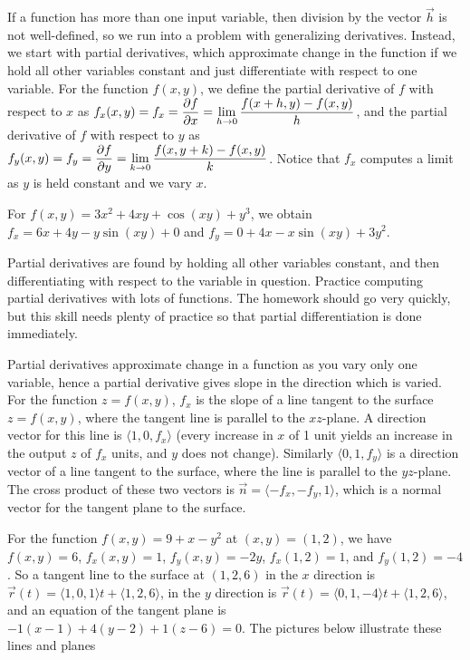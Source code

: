 If a function has more than one input variable, then division by the
vector $\vec h$ is not well-defined, so we run into a problem with
generalizing derivatives.  Instead, we start with partial derivatives,
which approximate change in the function if we hold all other
variables constant and just differentiate with respect to one
variable.  For the function $f(x,y)$, we define the partial derivative
of $f$ with respect to $x$ as $\displaystyle f_x(x,y)=f_x = \frac{\partial f}{\partial x}=
\lim_{h\to 0}\frac{f(x+h,y)-f(x,y)}{h}$, and the partial derivative of
$f$ with respect to $y$ as $\displaystyle f_y(x,y)=f_y =\frac{\partial f}{\partial y}=
\lim_{k\to 0}\frac{f(x,y+k)-f(x,y)}{k}$. Notice that $f_x$ computes a
limit as $y$ is held constant and we vary $x$. 
\begin{example}
For
$f(x,y)=3x^2+4xy+\cos(xy)+y^3$, we obtain $f_x=6x+4y-y\sin(xy)+0$ and
$f_y=0+4x-x\sin(xy)+3y^2$.
\end{example}
 Partial derivatives are found by holding
all other variables constant, and then differentiating with respect to
the variable in question. Practice computing partial derivatives with
lots of functions. The homework should go very quickly, but this skill
needs plenty of practice so that partial differentiation is done
immediately.

Partial derivatives approximate change in a function as you vary only
one variable, hence a partial derivative gives slope in the direction
which is varied. For the function $z=f(x,y)$, $f_x$ is the slope of a
line tangent to the surface $z=f(x,y)$, where the tangent line is
parallel to the $xz$-plane. A direction vector for this line is
$\langle1,0,f_x\rangle$ (every increase in $x$ of 1 unit yields an
increase in the output $z$ of $f_x$ units, and $y$ does not change). 
Similarly $\langle0,1,f_y\rangle$ is a direction vector of a line
tangent to the surface, where the line is parallel to the $yz$-plane.
The cross product of these two vectors is $\vec n =
\langle-f_x,-f_y,1\rangle$, which is a normal vector for the tangent
plane to the surface. 

\begin{example}
For the function $f(x,y)=9+x-y^2$ at
$(x,y)=(1,2)$, we have $f(x,y)=6$, $f_x(x,y) =1$, $f_y(x,y)=-2y$,
$f_x(1,2)=1$, and $f_y(1,2)=-4$. So a tangent line to the surface at
$(1,2,6)$ in the $x$ direction is $\vec r(t) = \langle1,0,1\rangle t+ 
\langle1,2,6\rangle$, in the $y$ direction is $\vec r(t) =
\langle0,1,-4\rangle t+  \langle1,2,6\rangle$, and an equation of the
tangent plane is $-1(x-1)+4(y-2)+1(z-6)=0$. The pictures below
illustrate these lines and planes 
\end{example}

